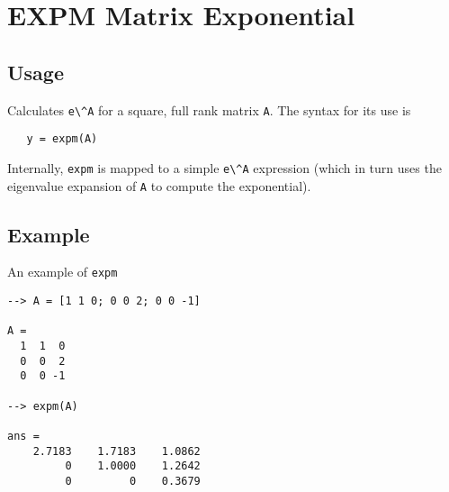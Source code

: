 \section{EXPM Matrix Exponential}

\subsection{Usage}

Calculates \verb|e\^A| for a square, full rank matrix \verb|A|.  The
syntax for its use is
\begin{verbatim}
   y = expm(A)
\end{verbatim}
Internally, \verb|expm| is mapped to a simple \verb|e\^A| expression (which
in turn uses the eigenvalue expansion of \verb|A| to compute the
exponential).
\subsection{Example}

An example of \verb|expm|
\begin{verbatim}
--> A = [1 1 0; 0 0 2; 0 0 -1]

A = 
  1  1  0 
  0  0  2 
  0  0 -1 

--> expm(A)

ans = 
    2.7183    1.7183    1.0862 
         0    1.0000    1.2642 
         0         0    0.3679 
\end{verbatim}
